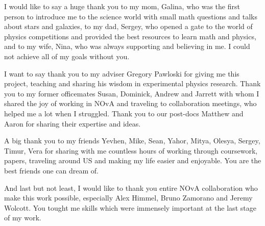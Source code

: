 
I would like to say a huge thank you to my mom, Galina, who was the first person to introduce me
to the science world with small math questions and talks about stars and galaxies, to my 
dad, Sergey, who opened a gate to the world of physics competitions and provided the best resources 
to learn math and physics, and to my wife, Nina, who was always supporting and believing in me.
I could not achieve all of my goals without you. 

I want to say thank you to my adviser Gregory Pawloski for giving me this project, teaching and
sharing his wisdom in experimental physics research. Thank you to my former officemates
Susan, Dominick, Andrew and Jarrett with whom I shared the joy of working in NOvA and 
traveling to collaboration meetings, who helped me a lot when I struggled. Thank you
to our post-docs Matthew and Aaron for sharing their expertise and ideas.

A big thank you to my friends Yevhen, Mike, Sean, Yahor, Mitya, 
Olesya, Sergey, Timur, Vera for sharing with me countless hours of working through coursework,
papers, traveling around US and making my life easier and enjoyable. You are the best friends
one can dream of. 

And last but not least, I would like to thank you entire NOvA collaboration who make this work
possible, especially Alex Himmel, Bruno Zamorano and Jeremy Wolcott. You tought me skills
which were immensely important at the last stage of my work. 

